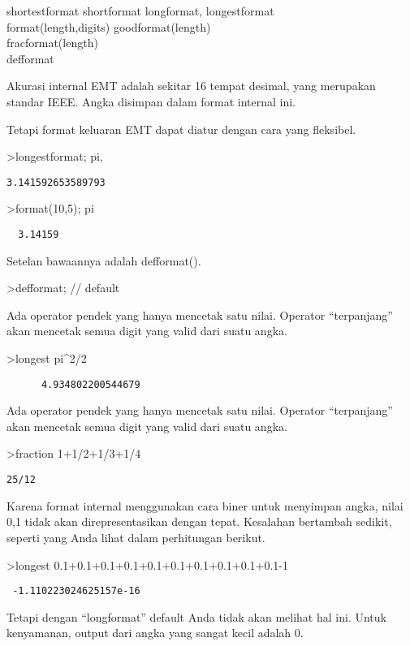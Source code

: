 \documentclass[
]{book}
\begin{document}
shortestformat shortformat longformat, longestformat\\
format(length,digits) goodformat(length)\\
fracformat(length)\\
defformat

Akurasi internal EMT adalah sekitar 16 tempat desimal, yang merupakan standar IEEE. Angka disimpan dalam format internal ini.

Tetapi format keluaran EMT dapat diatur dengan cara yang fleksibel.

\textgreater longestformat; pi,

\begin{verbatim}
3.141592653589793
\end{verbatim}

\textgreater format(10,5); pi

\begin{verbatim}
  3.14159 
\end{verbatim}

Setelan bawaannya adalah defformat().

\textgreater defformat; // default

Ada operator pendek yang hanya mencetak satu nilai. Operator ``terpanjang'' akan mencetak semua digit yang valid dari suatu angka.

\textgreater longest pi\^{}2/2

\begin{verbatim}
      4.934802200544679 
\end{verbatim}

Ada operator pendek yang hanya mencetak satu nilai. Operator ``terpanjang'' akan mencetak semua digit yang valid dari suatu angka.

\textgreater fraction 1+1/2+1/3+1/4

\begin{verbatim}
25/12
\end{verbatim}

Karena format internal menggunakan cara biner untuk menyimpan angka, nilai 0,1 tidak akan direpresentasikan dengan tepat. Kesalahan bertambah sedikit, seperti yang Anda lihat dalam perhitungan berikut.

\textgreater longest 0.1+0.1+0.1+0.1+0.1+0.1+0.1+0.1+0.1+0.1-1

\begin{verbatim}
 -1.110223024625157e-16 
\end{verbatim}

Tetapi dengan ``longformat'' default Anda tidak akan melihat hal ini. Untuk kenyamanan, output dari angka yang sangat kecil adalah 0.
\end{document}
